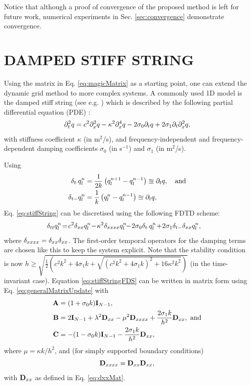 \documentclass[fleqn]{jaes}
\begin{document}
Notice that although a proof of convergence of the proposed method is left for future work, numerical experiments in Sec. \ref{sec:convergence} demonstrate convergence.

\section{DAMPED STIFF STRING}\label{sec:stiffString}
Using the matrix in Eq. \eqref{eq:magicMatrix} as a starting point, one can extend the dynamic grid method to more complex systems. A commonly used 1D model is the damped stiff string (see e.g. \cite{Willemsen2019}) which is described by the following partial differential equation (PDE) \cite{Bensa2003}:
\begin{equation}\label{eq:stiffString}
    \ptt q = c^2 \pxx q - \kappa^2 \pxxxx q - 2\sigma_0\pt q + 2\sigma_1\pt\pxx q,
\end{equation} 
with stiffness coefficient $\kappa$ (in m$^2$/s), and frequency-independent and frequency-dependent damping coefficients $\sigma_0$ (in s$^{-1}$) and $\sigma_1$ (in m$^2$/s).

Using
\begin{subequations}
\begin{align}
    \dtd \qln &= \frac{1}{2k}\left(q_l^{n+1} - q_l^{n-1}\right) \approxeq \pt q,\quad  \text{and}\\
     \dtm \qln &= \frac{1}{k}\left(\qln- q_l^{n-1}\right) \approxeq  \pt q,
\end{align}
\end{subequations}
Eq. \eqref{eq:stiffString} can be discretised using the following FDTD scheme:
\begin{equation}\label{eq:stiffStringFDS}
    \!\!\!\!\!\!\!\!\!\dtt \qln \!=\! c^2 \dxx \qln \!-\! \kappa^2 \dxxxx \qln\!\! -\! 2\sigma_0\dtd \qln\! +\! 2 \sigma_1 \dtm \dxx \qln,\!\!\!
\end{equation}
where $\delta_{xxxx} = \delta_{xx}\delta_{xx}$. The first-order temporal operators for the damping terms are chosen like this to keep the system explicit. Note that the stability condition is now $h\! \geq\! \sqrt{\tfrac{1}{2}\left(c^2k^2 + 4\sigma_1 k + \sqrt{(c^2k^2 + 4\sigma_1k)^2 +16\kappa^2k^2}\right)}$ (in the time-invariant case).
Equation \eqref{eq:stiffStringFDS} can be written in matrix form using Eq. \eqref{eq:generalMatrixUpdate} with 
\begin{equation}\label{eq:stiffStringMats}
\begin{aligned}
    \A &= (1 + \sigma_0k)\I_{N-1},\\ \B &= 2\I_{N-1} + \lambda^2 \Dxx - \mu^2 \Dxxxx + \frac{2\sigma_1k}{h^2}\Dxx, \  \text{and}\\
    \C &= -(1 - \sigma_0k)\I_{N-1} - \frac{2\sigma_1k}{h^2}\Dxx,
\end{aligned}
\end{equation}
where $\mu = \kappa k/h^2$, and (for simply supported boundary conditions)
\begin{equation}\label{eq:DxxxxMat}
    \Dxxxx = \Dxx\Dxx,
\end{equation}
with $\mathbf{D}_{xx}$ as defined in Eq. \eqref{eq:dxxMat}.
\end{document}
